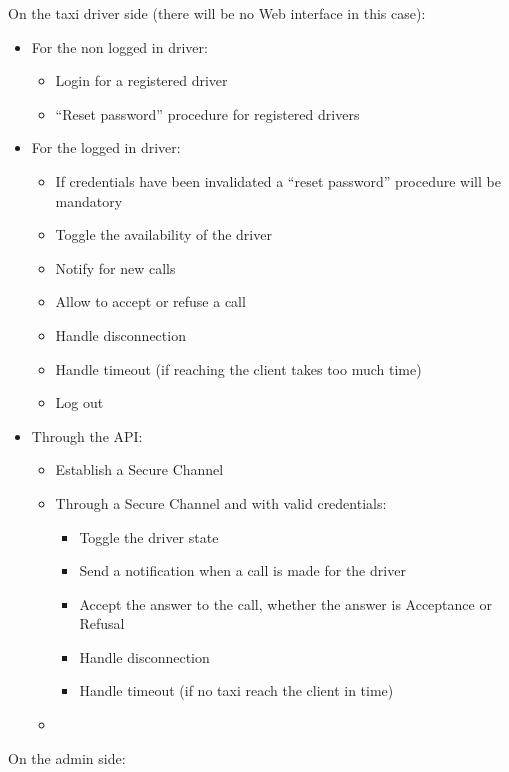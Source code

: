\documentclass{article}
\begin{document}
On the taxi driver side (there will be no Web interface in this case):\@
\begin{itemize}
	\item For the non logged in driver:
		\begin{itemize}
			\item Login for a registered driver 
			\item ``Reset password'' procedure for registered drivers
		\end{itemize}
	\item For the logged in driver:
		\begin{itemize}
			\item If credentials have been invalidated a ``reset password'' procedure will be mandatory
			\item Toggle the availability of the driver
			\item Notify for new calls
			\item Allow to accept or refuse a call
			\item Handle disconnection 
			\item Handle timeout (if reaching the client takes too much time)
			\item Log out
		\end{itemize}
	\item Through the API:\@
		\begin{itemize}
			\item Establish a Secure Channel
			\item Through a Secure Channel and with valid credentials:\@
				\begin{itemize}
					\item Toggle the driver state
					\item Send a notification when a call is made for the driver
					\item Accept the answer to the call, whether the answer is Acceptance or Refusal
					\item Handle disconnection
					\item Handle timeout (if no taxi reach the client in time)%
				\end{itemize}
			\item 
		\end{itemize}
\end{itemize}
On the admin side:\@
\end{document}
